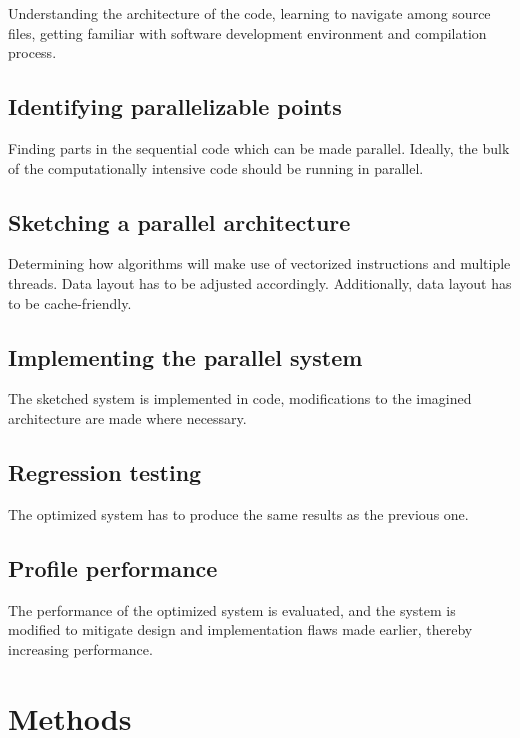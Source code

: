 \documentclass[12pt]{article}
\begin{document}
	Understanding the architecture of the code, learning to navigate among source files, getting familiar with software development environment and compilation process.
	
	\subsection{Identifying parallelizable points}
	
	Finding parts in the sequential code which can be made parallel. Ideally, the bulk of the computationally intensive code should be running in parallel.
		
	\subsection{Sketching a parallel architecture}
	
	Determining how algorithms will make use of vectorized instructions and multiple threads. Data layout has to be adjusted accordingly. Additionally, data layout has to be cache-friendly.
	
	\subsection{Implementing the parallel system}
	
	The sketched system is implemented in code, modifications to the imagined architecture are made where necessary.
	
	\subsection{Regression testing}
	
	The optimized system has to produce the same results as the previous one.
	
	\subsection{Profile performance}
	
	The performance of the optimized system is evaluated, and the system is modified to mitigate design and implementation flaws made earlier, thereby increasing performance.
	
	

	\newpage
	\section{Methods}
	
\end{document}
